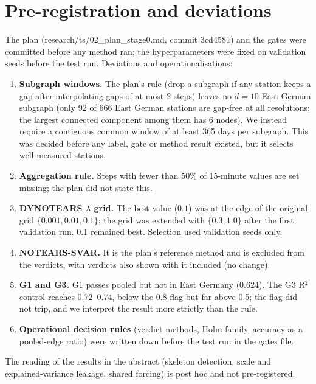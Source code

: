 \documentclass[10pt,a4paper]{article}
\begin{document}
\section{Pre-registration and deviations}
The plan (research/ts/02\_plan\_stage0.md, commit 3cd4581) and the gates were committed before any method ran; the hyperparameters were fixed on validation seeds before the test run. Deviations and operationalisations:
\begin{enumerate}
\item \textbf{Subgraph windows.} The plan's rule (drop a subgraph if any station keeps a gap after interpolating gaps of at most 2 steps) leaves no $d{=}10$ East German subgraph (only 92 of 666 East German stations are gap-free at all resolutions; the largest connected component among them has 6 nodes). We instead require a contiguous common window of at least 365 days per subgraph. This was decided before any label, gate or method result existed, but it selects well-measured stations.
\item \textbf{Aggregation rule.} Steps with fewer than 50\% of 15-minute values are set missing; the plan did not state this.
\item \textbf{DYNOTEARS $\lambda$ grid.} The best value ($0.1$) was at the edge of the original grid $\{0.001, 0.01, 0.1\}$; the grid was extended with $\{0.3, 1.0\}$ after the first validation run. 0.1 remained best. Selection used validation seeds only.
\item \textbf{NOTEARS-SVAR.} It is the plan's reference method and is excluded from the verdicts, with verdicts also shown with it included (no change).
\item \textbf{G1 and G3.} G1 passes pooled but not in East Germany (0.624). The G3 R$^2$ control reaches 0.72--0.74, below the 0.8 flag but far above 0.5; the flag did not trip, and we interpret the result more strictly than the rule.
\item \textbf{Operational decision rules} (verdict methods, Holm family, accuracy as a pooled-edge ratio) were written down before the test run in the gates file.
\end{enumerate}
The reading of the results in the abstract (skeleton detection, scale and explained-variance leakage, shared forcing) is post hoc and not pre-registered.
\end{document}
